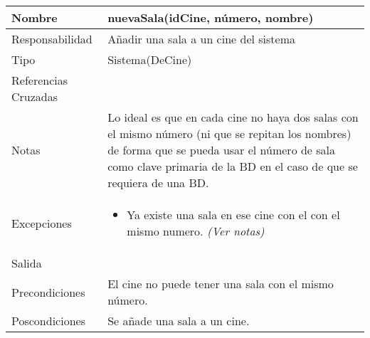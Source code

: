 \documentclass{article}
\begin{document}
\begin{table}[h]
\begin{tabular}{|l|l|l|l|l|l|}
\hline
\multicolumn{2}{|p{3cm}|}{Nombre} & \multicolumn{4}{p{10cm}|}{\textbf{nuevaSala(idCine, número, nombre)}}\\
\hline
\multicolumn{2}{|p{3cm}|}{Responsabilidad} & \multicolumn{4}{p{10cm}|}{Añadir una sala a un cine del sistema} \\
\hline
\multicolumn{2}{|p{3cm}|}{Tipo} & \multicolumn{4}{p{10cm}|}{Sistema(DeCine)} \\
\hline
\multicolumn{2}{|p{3cm}|}{Referencias Cruzadas} & \multicolumn{4}{p{10cm}|}{} \\
\hline
\multicolumn{2}{|p{3cm}|}{Notas} & \multicolumn{4}{p{10cm}|}{Lo ideal es que en cada cine no haya dos salas con el mismo número (ni que se repitan los nombres) de forma que se pueda usar el número de sala como clave primaria de la BD en el caso de que se requiera de una BD.} \\
\hline
\multicolumn{2}{|p{3cm}|}{Excepciones} & \multicolumn{4}{p{10cm}|}{\begin{itemize}
\item Ya existe una sala en ese cine con el con el mismo numero. \textit{(Ver notas)}
\end{itemize}} \\
\hline
\multicolumn{2}{|p{3cm}|}{Salida} & \multicolumn{4}{p{10cm}|}{} \\
\hline
\multicolumn{2}{|p{3cm}|}{Precondiciones} & \multicolumn{4}{p{10cm}|}{El cine no puede tener una sala con el mismo número.} \\
\hline
\multicolumn{2}{|p{3cm}|}{Poscondiciones} & \multicolumn{4}{p{10cm}|}{Se añade una sala a un cine.} \\
\hline
\end{tabular}
\end{table}
\end{document}
